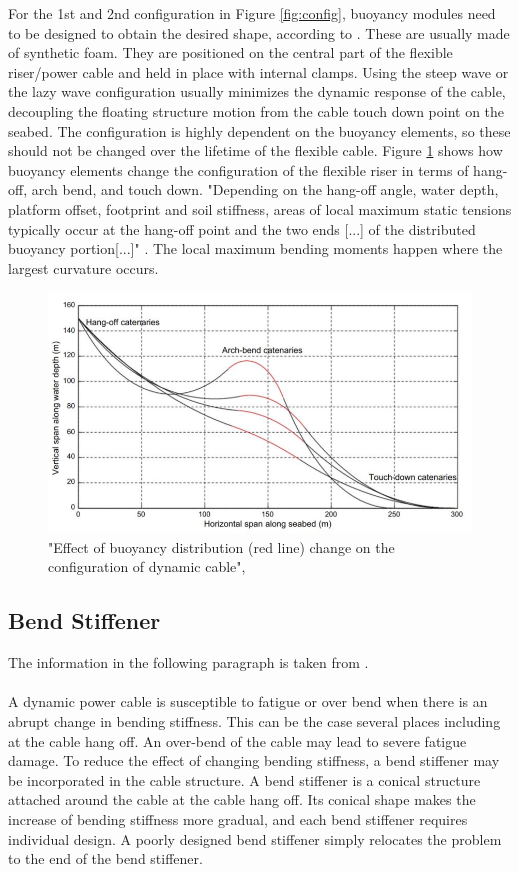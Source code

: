 \noindent For the 1st and 2nd configuration in Figure \ref{fig:config}, buoyancy modules need to be designed to obtain the desired shape, according to \cite{srinil2016}. These are usually made of synthetic foam. They are positioned on the central part of the flexible riser/power cable and held in place with internal clamps. Using the steep wave or the lazy wave configuration usually minimizes the dynamic response of the cable,  decoupling the floating structure motion from the cable touch down point on the seabed. The configuration is highly dependent on the buoyancy elements, so these should not be changed over the lifetime of the flexible cable. Figure \ref{fig:bend} shows how buoyancy elements change the configuration of the flexible riser in terms of hang-off, arch bend, and touch down. "Depending on the hang-off angle, water depth, platform offset, footprint and soil stiffness, areas of local maximum static tensions typically occur at the hang-off point and
the two ends [...] of the distributed buoyancy portion[...]" \cite{srinil2016}. The local maximum bending moments happen where the largest curvature occurs.

\begin{figure}[H]
\centering
\includegraphics[scale=0.6]{figures/bend}
\caption[$\; \:$Effect of buoyancy distribution]{"Effect of buoyancy distribution (red line) change on the configuration of dynamic
cable", \cite{srinil2016}}
 \label{fig:bend}
\end{figure}
\subsection{Bend Stiffener}
The information in the following paragraph is taken from \cite{Worzyk}. \\\\
A dynamic power cable is susceptible to fatigue or over bend when there is an abrupt change in bending stiffness. This can be the case several places including at the cable hang off. An over-bend of the cable may lead to severe fatigue damage. To reduce the effect of changing bending stiffness, a bend stiffener may be incorporated in the cable structure. A bend stiffener is a conical structure attached around the cable at the cable hang off. Its conical shape makes the increase of bending stiffness more gradual, and each bend stiffener requires individual design. A poorly designed bend stiffener simply relocates the problem to the end of the bend stiffener.


